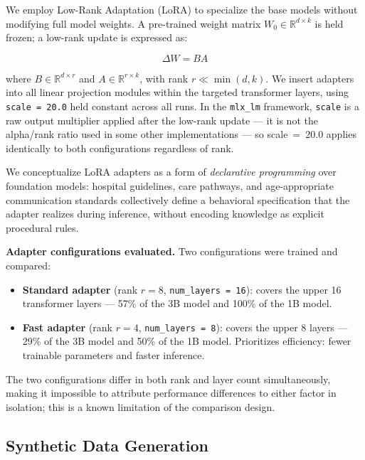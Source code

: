 \documentclass[journal]{IEEEtai}
\begin{document}
We employ Low-Rank Adaptation (LoRA) \cite{hu2022lora} to specialize the base models without modifying full model weights. A pre-trained weight matrix $W_0 \in \mathbb{R}^{d \times k}$ is held frozen; a low-rank update is expressed as:

\begin{equation}
\Delta W = BA
\end{equation}

where $B \in \mathbb{R}^{d \times r}$ and $A \in \mathbb{R}^{r \times k}$, with rank $r \ll \min(d, k)$. We insert adapters into all linear projection modules within the targeted transformer layers, using \texttt{scale = 20.0} held constant across all runs. In the \texttt{mlx\_lm} framework, \texttt{scale} is a raw output multiplier applied after the low-rank update --- it is not the alpha/rank ratio used in some other implementations --- so scale~=~20.0 applies identically to both configurations regardless of rank.

We conceptualize LoRA adapters as a form of \textit{declarative programming} over foundation models: hospital guidelines, care pathways, and age-appropriate communication standards collectively define a behavioral specification that the adapter realizes during inference, without encoding knowledge as explicit procedural rules.

\textbf{Adapter configurations evaluated.} Two configurations were trained and compared:

\begin{itemize}
    \item \textbf{Standard adapter} (rank $r = 8$, \texttt{num\_layers = 16}): covers the upper 16 transformer layers --- 57\% of the 3B model and 100\% of the 1B model.
    \item \textbf{Fast adapter} (rank $r = 4$, \texttt{num\_layers = 8}): covers the upper 8 layers --- 29\% of the 3B model and 50\% of the 1B model. Prioritizes efficiency: fewer trainable parameters and faster inference.
\end{itemize}

The two configurations differ in both rank and layer count simultaneously, making it impossible to attribute performance differences to either factor in isolation; this is a known limitation of the comparison design.

\subsection{Synthetic Data Generation}
\end{document}
